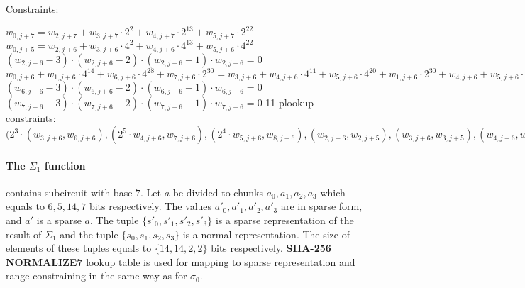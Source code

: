 Constraints:
\begin{center}
    $w_{0, j + 7} = w_{2, j + 7} + w_{3, j + 7} \cdot 2^{2} + w_{4, j + 7} \cdot 2^{13} + w_{5, j + 7} \cdot 2^{22}$ \\
    $w_{0, j + 5} = w_{2, j + 6} + w_{3, j + 6} \cdot 4^{2} + w_{4, j + 6} \cdot 4^{13} + w_{5, j + 6} \cdot 4^{22}$ \\
    $(w_{2,j + 6} - 3) \cdot (w_{2,j + 6} - 2) \cdot (w_{2,j + 6} - 1) \cdot w_{2,j + 6} = 0$ \\
    $w_{0, j + 6} + w_{1, j + 6} \cdot 4^{14} + w_{6, j + 6} \cdot 4^{28} + w_{7, j + 6} \cdot 2^{30} = w_{3, j + 6} + w_{4, j + 6} \cdot 4^{11} + w_{5, j + 6} \cdot 4^{20} + w_{1, j + 6} \cdot 2^{30} + w_{4, j + 6} + w_{5, j + 6} \cdot 4^{9} + w_{2, j + 6} \cdot 4^{19} + w_{3, j + 6} \cdot 4^{21} + w_{5, j + 6} + w_{2, j + 6} \cdot 4^{10}+ w_{3, j + 6} \cdot 4^{12} + w_{4, j + 6} \cdot 4^{23}$ \\
    $(w_{6, j + 6} - 3) \cdot (w_{6, j + 6} - 2) \cdot (w_{6, j + 6} - 1) \cdot w_{6, j + 6} = 0$
    $(w_{7, j + 6} - 3) \cdot (w_{7, j + 6} - 2) \cdot (w_{7, j + 6} - 1) \cdot w_{7, j + 6} = 0$
    11 plookup constraints: $(2^3 \cdot (w_{3, j + 6}, w_{6, j + 6}), (2^5 \cdot w_{4, j + 6}, w_{7, j + 6}), (2^4 \cdot w_{5, j+6}, w_{8, j + 6}), (w_{2,j + 6}, w_{2,j+5}), (w_{3, j + 6}, w_{3, j + 5}), (w_{4, j + 6}, w_{4, j + 5}), (w_{5, j + 6}, w_{5, j + 5}), (w_{5, j + 5}, w_{0, j + 6}), (w_{6, j + 5}, w_{1, j + 6}), (w_{7, j + 5}, w_{6, j + 6}), (w_{8, j + 5}, w_{7, j + 6})$ \\
\end{center}

\paragraph{The $\Sigma_1$ function}
contains subcircuit with base $7$.
Let $a$ be divided to chunks $a_0, a_1, a_2, a_3$ which equals to $6, 5, 14, 7$ bits respectively.
The values $a'_0, a'_1, a'_2, a'_3$ are in sparse form, and $a'$ is a sparse $a$.
The tuple $\{ s'_0, s'_1, s'_2, s'_3\}$ is a sparse representation of the result of $\Sigma_1$ and the tuple $\{ s_0, s_1, s_2, s_3\}$  is a normal representation.
The size of elements of these tuples equals to $\{14, 14, 2, 2\}$ bits respectively.
\textbf{SHA-256 NORMALIZE7} lookup table is used for mapping to sparse representation and range-constraining in the same way as for $\sigma_0$.

